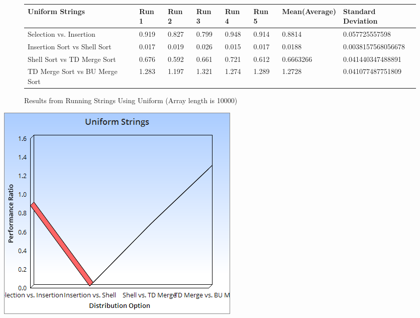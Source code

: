 \documentclass{article}
\begin{document}
\begin{figure}[H]
\centering
\begin{adjustwidth}{-3.4cm}{}
\begin{tabular}{| l | l | l | l | l | l | l | l |}
\hline
Uniform Strings & Run 1 & Run 2 & Run 3 & Run 4 & Run 5 & Mean(Average) & Standard Deviation\\ \hline
Selection vs. Insertion & 0.919 & 0.827 & 0.799 & 0.948 & 0.914 & 0.8814 & 0.057725557598\\ \hline
Insertion Sort vs Shell Sort & 0.017 & 0.019 & 0.026 & 0.015 & 0.017 & 0.0188 & 0.0038157568056678 \\ \hline
Shell Sort vs TD Merge Sort & 0.676 & 0.592 & 0.661 & 0.721 & 0.612 & 0.6663266 & 0.041440347488891\\ \hline
TD Merge Sort vs BU Merge Sort & 1.283 & 1.197 & 1.321 & 1.274 & 1.289 & 1.2728 & 0.041077487751809\\ \hline
\end{tabular}
\caption{Results from Running Strings Using Uniform (Array length is 10000)}
\end{adjustwidth}
\end{figure}
\includegraphics[scale=0.5]{UniformStrings.png}





\newpage
\end{document}
